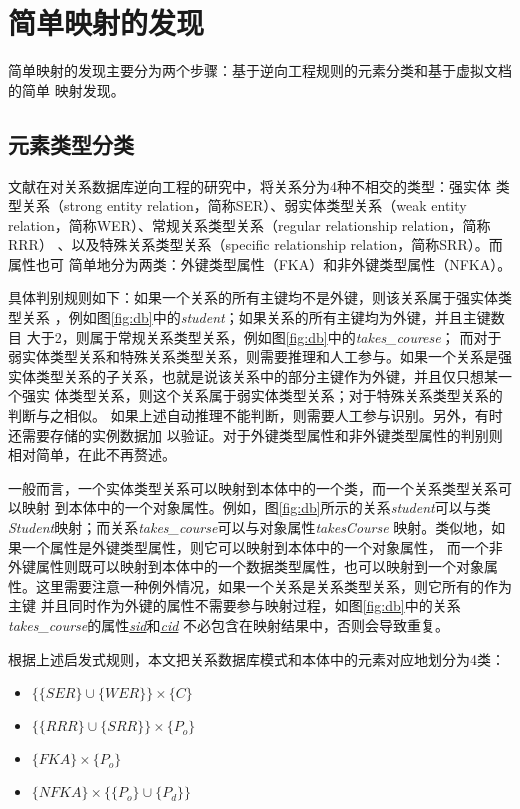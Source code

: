 \chapter{简单映射的发现}
\label{chap02}

简单映射的发现主要分为两个步骤：基于逆向工程规则的元素分类和基于虚拟文档的简单
映射发现。

\section{元素类型分类}
\label{2:1}
文献\cite{14}在对关系数据库逆向工程的研究中，将关系分为4种不相交的类型：强实体
类型关系（strong entity relation，简称SER）、弱实体类型关系（weak entity
relation，简称WER）、常规关系类型关系（regular relationship relation，简称RRR）
、以及特殊关系类型关系（specific relationship relation，简称SRR）。而属性也可
简单地分为两类：外键类型属性（FKA）和非外键类型属性（NFKA）。

具体判别规则如下：如果一个关系的所有主键均不是外键，则该关系属于强实体类型关系
，例如图\ref{fig:db}中的\emph{student}；如果关系的所有主键均为外键，并且主键数目
大于2，则属于常规关系类型关系，例如图\ref{fig:db}中的\emph{takes\_courese}；
而对于弱实体类型关系和特殊关系类型关系，则需要推理和人工参与。如果一个关系是强
实体类型关系的子关系，也就是说该关系中的部分主键作为外键，并且仅只想某一个强实
体类型关系，则这个关系属于弱实体类型关系；对于特殊关系类型关系的判断与之相似。
如果上述自动推理不能判断，则需要人工参与识别。另外，有时还需要存储的实例数据加
以验证。对于外键类型属性和非外键类型属性的判别则相对简单，在此不再赘述。

一般而言，一个实体类型关系可以映射到本体中的一个类，而一个关系类型关系可以映射
到本体中的一个对象属性。例如，图\ref{fig:db}所示的关系\emph{student}可以与类
\emph{Student}映射；而关系\emph{takes\_course}可以与对象属性\emph{takesCourse}
映射。类似地，如果一个属性是外键类型属性，则它可以映射到本体中的一个对象属性，
而一个非外键属性则既可以映射到本体中的一个数据类型属性，也可以映射到一个对象属
性。这里需要注意一种例外情况，如果一个关系是关系类型关系，则它所有的作为主键
并且同时作为外键的属性不需要参与映射过程，如图\ref{fig:db}中的关系
\emph{takes\_course}的属性\emph{\underline{sid}}和\emph{\underline{cid}}
不必包含在映射结果中，否则会导致重复。

根据上述启发式规则，本文把关系数据库模式和本体中的元素对应地划分为4类：

\begin{itemize}
\item{$\{\{SER\} \cup \{WER\} \} \times \{C\}$}
\item{$\{\{RRR\} \cup \{SRR\} \} \times \{P_o\}$}
\item{$\{FKA\} \times \{P_o\}$}
\item{$\{NFKA\} \times \{\{P_o\} \cup \{P_d\}\}$}
\end{itemize}

